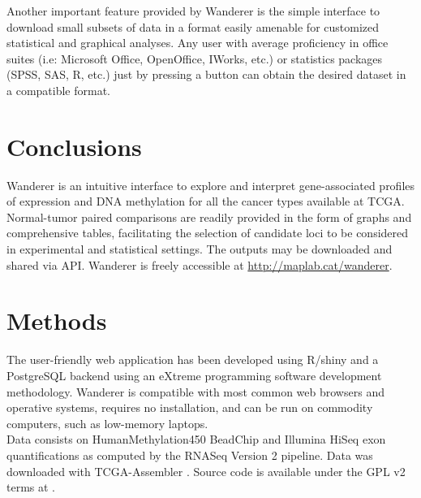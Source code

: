 \documentclass{bmcart}
\begin{document}
Another important feature provided by Wanderer is the simple interface to download small subsets of data in a format easily amenable for customized statistical and graphical analyses. Any user with average proficiency in office suites (i.e: Microsoft Office, OpenOffice, IWorks, etc.) or statistics packages (SPSS, SAS, R, etc.) just by pressing a button can obtain the desired dataset in a compatible format.\\

\section*{Conclusions}

Wanderer is an intuitive interface to explore and interpret gene-associated profiles of expression and DNA methylation for all the cancer types available at TCGA. Normal-tumor paired comparisons are readily provided in the form of graphs and comprehensive tables, facilitating the selection of candidate loci to be considered in experimental and statistical settings. The outputs may be downloaded and shared via API. Wanderer is freely accessible at \url{http://maplab.cat/wanderer}.\\



\section*{Methods}
The user-friendly web application has been developed using R/shiny and a PostgreSQL backend using an eXtreme programming software development methodology. Wanderer is compatible with most common web browsers and operative systems, requires no installation, and can be run on commodity computers, such as low-memory laptops.\\
 
Data consists on HumanMethylation450 BeadChip and Illumina HiSeq exon quantifications as computed by the RNASeq Version 2 pipeline. Data was downloaded with TCGA-Assembler \cite{zhu2014tcga}. Source code is available under the GPL v2 terms at \cite{sourceforge}.







\end{document}
